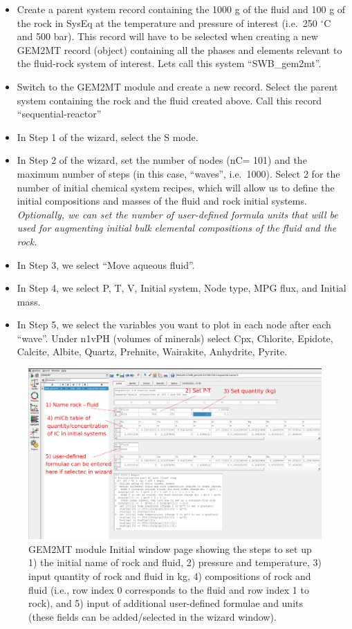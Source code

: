 \documentclass[
]{book}
\begin{document}
\begin{itemize}
\item
  Create a parent system record containing the 1000 g of the fluid and 100 g of the rock in SysEq at the temperature and pressure of interest (i.e.~250 \(^{\circ}\)C and 500 bar). This record will have to be selected when creating a new GEM2MT record (object) containing all the phases and elements relevant to the fluid-rock system of interest. Lets call this system ``SWB\_gem2mt''.
\item
  Switch to the GEM2MT module and create a new record. Select the parent system containing the rock and the fluid created above. Call this record ``sequential-reactor''
\item
  In Step 1 of the wizard, select the S mode.
\item
  In Step 2 of the wizard, set the number of nodes (nC= 101) and the maximum number of steps (in this case, ``waves'', i.e.~1000). Select 2 for the number of initial chemical system recipes, which will allow us to define the initial compositions and masses of the fluid and rock initial systems. \emph{Optionally, we can set the number of user-defined formula units that will be used for augmenting initial bulk elemental compositions of the fluid and the rock.}
\item
  In Step 3, we select ``Move aqueous fluid''.
\item
  In Step 4, we select P, T, V, Initial system, Node type, MPG flux, and Initial mass.
\item
  In Step 5, we select the variables you want to plot in each node after each ``wave''. Under n1vPH (volumes of minerals) select Cpx, Chlorite, Epidote, Calcite, Albite, Quartz, Prehnite, Wairakite, Anhydrite, Pyrite.
\end{itemize}

\begin{figure}
\includegraphics[width=9\linewidth]{figures/module5/fig-2} \caption{GEM2MT module Initial window page showing the steps to set up 1) the initial name of rock and fluid, 2) pressure and temperature, 3) input quantity of rock and fluid in kg, 4) compositions of rock and fluid (i.e., row index 0 corresponds to the fluid and row index 1 to rock), and 5) input of additional user-defined formulae and units (these fields can be added/selected in the wizard window).}\label{fig:fig-2e}
\end{figure}
\end{document}

